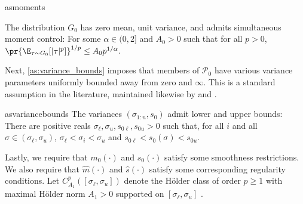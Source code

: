 \documentclass[12pt, reqno]{amsart}
\newcommand{\sigl}{\sigma_\ell}
\newcommand{\sigu}{\sigma_u}
\newcommand{\hyperparams}{\sigl, \sigu, s_{0\ell}, s_{0u}}
\newcommand{\hatm}{\hat m}
\newcommand{\hats}{\hat s}
\numberwithin{equation}{section}
\begin{document}
\begin{restatable}{as}{moments}
\label{as:moments}

The distribution $G_0$ has zero mean, unit variance, and admits simultaneous moment
control: For some $\alpha \in (0,2]$ and $A_0 > 0$ such
that for all $p > 0$, $\pr{\E_{\tau \sim G_0}[|\tau|^p]}^{1/p} \le A_0 p^
{1/\alpha}.
$
\end{restatable}



Next, \cref{as:variance_bounds} imposes that members of $\mathcal P_0$ have various
variance parameters uniformly bounded away from zero and $\infty$. This is a standard
assumption in the literature, maintained likewise by \citet{jiang2020general} and
\citet{soloff2021multivariate}.

\begin{restatable}{as}{variancebounds}
\label{as:variance_bounds} 
The variances $(\sigma_{1:n}, s_0)$ admit lower and upper
 bounds: There are positive reals $\hyperparams >0$ such that, for all $i$ and all
 $\sigma \in (\sigl, \sigu)$, $\sigl < \sigma_i < \sigu$ and $s_{0\ell} < s_0(\sigma) < s_
 {0u}$.
\end{restatable}

Lastly, we require that $m_0(\cdot)$ and $s_0(\cdot)$ satisfy some smoothness
restrictions. We also require that $\hatm(\cdot)$ and $\hats(\cdot)$ satisfy some
corresponding regularity conditions. Let $C_{A_1}^p([\sigl,\sigu])$ denote the H\"older
class of order $p \ge 1$ with maximal H\"older norm $A_1 > 0$ supported on $
[\sigl,\sigu]$ \citep[Section 2.7.1,][]{vaart1996weak}.
\end{document}
